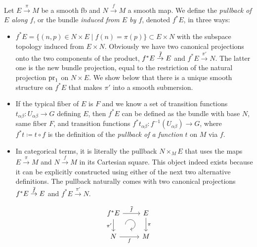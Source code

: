 \begin{defn}\label{Pullback bundle}
    Let $E\overset{\pi}{\to}M$ be a smooth \gls{fb} and $N\overset{f}{\to}M$ a smooth map. We define the \emph{pullback of $E$ along $f$}, or the bundle \emph{induced from $E$ by $f$}, denoted $f^\ast E$, in three ways:
    \begin{itemize}        
        \item $f^\ast E=\{(n,p)\in N\times E\mid f(n)=\pi(p)\}\subset E\times N$ with the subspace topology induced from $E\times N$. Obviously we have two canonical projections onto the two components of the product, $f^\ast E\overset{\wt{f}}{\to}E$ and $f^\ast E\overset{\pi'}{\to}N$. The latter one is the new bundle projection, equal to the restriction of the natural projection $\operatorname{pr}_1$ on $N\times E$. We show below that there is a unique smooth structure on $f^\ast E$ that makes $\pi'$ into a smooth submersion.
        \item If the typical fiber of $E$ is $F$ and we know a set of transition functions $t_{\alpha\beta}:U_{\alpha\beta}\to G$ defining $E$, then $f^\ast E$ can be defined as the bundle with base $N$, same fiber $F$, and transition functions $f^\ast t_{\alpha\beta}:f^{-1}(U_{\alpha\beta})\to G$, where $f^\ast t\coloneqq t\circ f$ is the definition of the \emph{pullback of a function} $t$ on $M$ via $f$.
        \item In categorical terms, it is literally the pullback $N\times_M E$ that uses the maps $E\overset{\pi}{\to}M$ and $N\overset{f}{\to}M$ in its Cartesian square. This object indeed exists because it can be explicitly constructed using either of the next two alternative definitions. The pullback naturally comes with two canonical projections $f^\ast E\overset{\wt{f}}{\to}E$ and $f^\ast E\overset{\pi'}{\to}N$.
    \end{itemize} 
    \[\begin{tikzcd}[every matrix/.append style={name=m},   
    execute at end picture={\draw [<-] ([xshift=-8mm,yshift=1mm]m-2-2.north) arc[start angle=-90,delta angle=270,radius=0.25cm];}]
   f^\ast E \arrow[r,"\wt{f}"]\arrow[d,swap,"\pi'"]& E\arrow[d,"\pi"] \\
   N\arrow[r,swap,"f"]& M
    \end{tikzcd}\label{eq pullback bundle diagram}\]
\end{defn}

